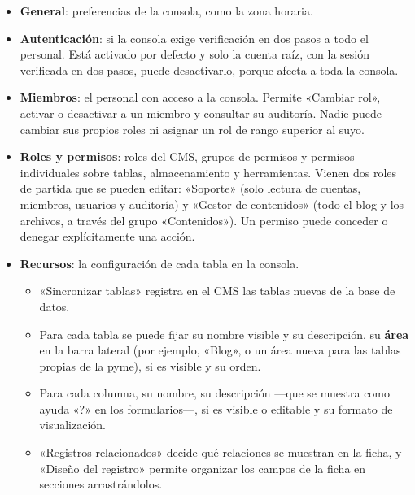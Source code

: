 \begin{itemize}
  \item \textbf{General}: preferencias de la consola, como la zona horaria.
  \item \textbf{Autenticación}: si la consola exige verificación en dos pasos
        a todo el personal. Está activado por defecto y solo la cuenta raíz,
        con la sesión verificada en dos pasos, puede desactivarlo, porque
        afecta a toda la consola.
  \item \textbf{Miembros}: el personal con acceso a la consola. Permite
        «Cambiar rol», activar o desactivar a un miembro y consultar su
        auditoría. Nadie puede cambiar sus propios roles ni asignar un rol de
        rango superior al suyo.
  \item \textbf{Roles y permisos}: roles del CMS, grupos de permisos y
        permisos individuales sobre tablas, almacenamiento y herramientas.
        Vienen dos roles de partida que se pueden editar: «Soporte» (solo
        lectura de cuentas, miembros, usuarios y auditoría) y «Gestor de
        contenidos» (todo el blog y los archivos, a través del grupo
        «Contenidos»). Un permiso puede conceder o denegar
        explícitamente una acción.
  \item \textbf{Recursos}: la configuración de cada tabla en la consola.
        \begin{itemize}
          \item «Sincronizar tablas» registra en el CMS las tablas nuevas de la
                base de datos.
          \item Para cada tabla se puede fijar su nombre visible y su
                descripción, su \textbf{área} en la barra lateral (por ejemplo,
                «Blog», o un área nueva para las tablas propias de la pyme),
                si es visible y su orden.
          \item Para cada columna, su nombre, su descripción ---que se muestra
                como ayuda «?» en los formularios---, si es visible o editable y
                su formato de visualización.
          \item «Registros relacionados» decide qué relaciones se muestran en
                la ficha, y «Diseño del registro» permite organizar los campos
                de la ficha en secciones arrastrándolos.
        \end{itemize}
\end{itemize}

